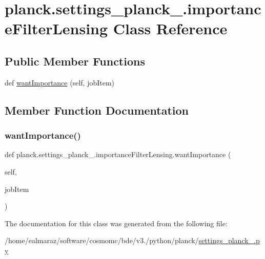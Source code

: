 \hypertarget{classplanck_1_1settings__planck__2015_1_1importanceFilterLensing}{}\section{planck.\+settings\+\_\+planck\+\_.\+importance\+Filter\+Lensing Class Reference}
\label{classplanck_1_1settings__planck__2015_1_1importanceFilterLensing}
\subsection*{Public Member Functions}
\begin{DoxyCompactItemize}
\item 
def \mbox{\hyperlink{classplanck_1_1settings__planck__2015_1_1importanceFilterLensing_af1c7d892e97a811284ce64e2a4513594}{want\+Importance}} (self, job\+Item)
\end{DoxyCompactItemize}


\subsection{Member Function Documentation}
\mbox{\label{classplanck_1_1settings__planck__2015_1_1importanceFilterLensing_af1c7d892e97a811284ce64e2a4513594}} 
\subsubsection{\texorpdfstring{want\+Importance()}{wantImportance()}}
{\footnotesize\ttfamily def planck.\+settings\+\_\+planck\+\_.\+importance\+Filter\+Lensing.\+want\+Importance (\begin{DoxyParamCaption}\item[{}]{self,  }\item[{}]{job\+Item }\end{DoxyParamCaption})}



The documentation for this class was generated from the following file\+:\begin{DoxyCompactItemize}
\item 
/home/ealmaraz/software/cosmomc/bde/v3./python/planck/\mbox{\hyperlink{settings__planck__2015_8py}{settings\+\_\+planck\+\_.\+py}}\end{DoxyCompactItemize}
